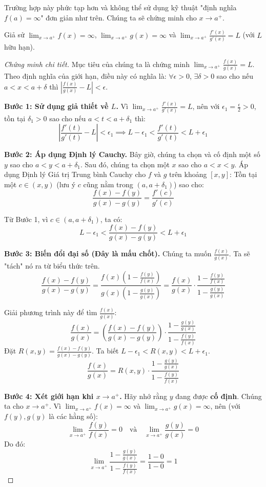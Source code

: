 Trường hợp này phức tạp hơn và không thể sử dụng kỹ thuật "định nghĩa $f(a) = \infty$" đơn giản như trên. Chúng ta sẽ chứng minh cho $x \to a^+$.

Giả sử $\lim_{x \to a^+} f(x) = \infty$, $\lim_{x \to a^+} g(x) = \infty$ và $\lim_{x \to a^+} \frac{f'(x)}{g'(x)} = L$ (với $L$ hữu hạn).

\begin{proof}[Chứng minh chi tiết]
Mục tiêu của chúng ta là chứng minh $\lim_{x \to a^+} \frac{f(x)}{g(x)} = L$. Theo định nghĩa của giới hạn, điều này có nghĩa là:
$\forall \epsilon > 0$, $\exists \delta > 0$ sao cho nếu $a < x < a + \delta$ thì $\left| \frac{f(x)}{g(x)} - L \right| < \epsilon$.

\textbf{Bước 1: Sử dụng giả thiết về $L$.}
Vì $\lim_{x \to a^+} \frac{f'(x)}{g'(x)} = L$, nên với $\epsilon_1 = \frac{\epsilon}{2} > 0$, tồn tại $\delta_1 > 0$ sao cho nếu $a < t < a + \delta_1$ thì:
$$ \left| \frac{f'(t)}{g'(t)} - L \right| < \epsilon_1 \implies L - \epsilon_1 < \frac{f'(t)}{g'(t)} < L + \epsilon_1 $$

\textbf{Bước 2: Áp dụng Định lý Cauchy.}
Bây giờ, chúng ta chọn và cố định một số $y$ sao cho $a < y < a + \delta_1$.
Sau đó, chúng ta chọn một $x$ sao cho $a < x < y$.
Áp dụng Định lý Giá trị Trung bình Cauchy cho $f$ và $g$ trên khoảng $[x, y]$:
Tồn tại một $c \in (x, y)$ (lưu ý $c$ cũng nằm trong $(a, a+\delta_1)$) sao cho:
$$ \frac{f(x) - f(y)}{g(x) - g(y)} = \frac{f'(c)}{g'(c)} $$

Từ Bước 1, vì $c \in (a, a+\delta_1)$, ta có:
$$ L - \epsilon_1 < \frac{f(x) - f(y)}{g(x) - g(y)} < L + \epsilon_1 $$

\textbf{Bước 3: Biến đổi đại số (Đây là mấu chốt).}
Chúng ta muốn $\frac{f(x)}{g(x)}$. Ta sẽ "tách" nó ra từ biểu thức trên.
$$ \frac{f(x) - f(y)}{g(x) - g(y)} = \frac{f(x) \left( 1 - \frac{f(y)}{f(x)} \right)}{g(x) \left( 1 - \frac{g(y)}{g(x)} \right)} = \frac{f(x)}{g(x)} \cdot \frac{1 - \frac{f(y)}{f(x)}}{1 - \frac{g(y)}{g(x)}} $$

Giải phương trình này để tìm $\frac{f(x)}{g(x)}$:
$$ \frac{f(x)}{g(x)} = \left( \frac{f(x) - f(y)}{g(x) - g(y)} \right) \cdot \frac{1 - \frac{g(y)}{g(x)}}{1 - \frac{f(y)}{f(x)}} $$
Đặt $R(x, y) = \frac{f(x) - f(y)}{g(x) - g(y)}$. Ta biết $L - \epsilon_1 < R(x, y) < L + \epsilon_1$.
$$ \frac{f(x)}{g(x)} = R(x, y) \cdot \frac{1 - \frac{g(y)}{g(x)}}{1 - \frac{f(y)}{f(x)}} $$

\textbf{Bước 4: Xét giới hạn khi $x \to a^+$.}
Hãy nhớ rằng $y$ đang được \textbf{cố định}. Chúng ta cho $x \to a^+$.
Vì $\lim_{x \to a^+} f(x) = \infty$ và $\lim_{x \to a^+} g(x) = \infty$, nên (với $f(y), g(y)$ là các hằng số):
$$ \lim_{x \to a^+} \frac{f(y)}{f(x)} = 0 \quad \text{và} \quad \lim_{x \to a^+} \frac{g(y)}{g(x)} = 0 $$
Do đó:
$$ \lim_{x \to a^+} \frac{1 - \frac{g(y)}{g(x)}}{1 - \frac{f(y)}{f(x)}} = \frac{1 - 0}{1 - 0} = 1 $$


\end{proof}
